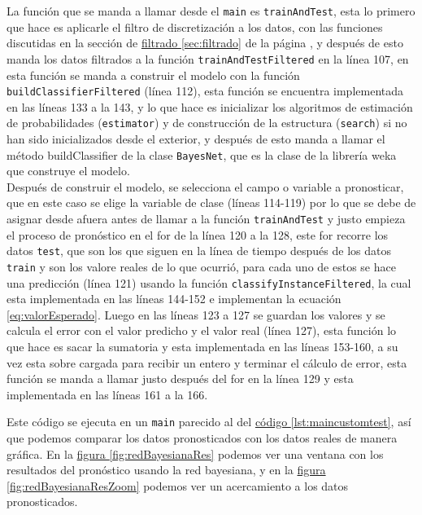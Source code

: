 La función que se manda a llamar desde el \texttt{main} es \texttt{trainAndTest}, esta lo primero que hace es aplicarle el filtro de discretización a los datos, con las funciones discutidas en la sección de \hyperref[sec:filtrado]{ filtrado \ref{sec:filtrado}} de la página \pageref{sec:filtrado}, y después de esto manda los datos filtrados a la función \texttt{trainAndTestFiltered} en la línea 107, en esta función se manda a construir el modelo con la función \texttt{buildClassifierFiltered} (línea 112), esta función se encuentra implementada en las líneas 133 a la 143, y lo que hace es inicializar los algoritmos de estimación de probabilidades (\texttt{estimator}) y de construcción de la estructura (\texttt{search}) si no han sido inicializados desde el exterior, y después de esto manda a llamar el método buildClassifier de la clase \texttt{BayesNet}, que es la clase de la librería weka que construye el modelo.\\
Después de construir el modelo, se selecciona el campo o variable a pronosticar, que en este caso se elige la variable de clase (líneas 114-119) por lo que se debe de asignar desde afuera antes de llamar a la función \texttt{trainAndTest} y justo empieza el proceso de pronóstico en el for de la línea 120 a la 128, este for recorre los datos \texttt{test}, que son los que siguen en la línea de tiempo después de los datos \texttt{train} y son los valore reales de lo que ocurrió, para cada uno de estos se hace una predicción (línea 121) usando la función \texttt{classifyInstanceFiltered}, la cual esta implementada en las líneas 144-152 e implementan la ecuación \ref{eq:valorEsperado}. Luego en las líneas 123 a 127 se guardan los valores y se calcula el error con el valor predicho y el valor real (línea 127), esta función lo que hace es sacar la sumatoria y esta implementada en las líneas 153-160, a su vez esta sobre cargada para recibir un entero y terminar el cálculo de error, esta función se manda a llamar justo después del for en la línea 129 y esta implementada en las líneas 161 a la 166.

Este código se ejecuta en un \texttt{main} parecido al del \hyperref[lst:maincustomtest]{ código \ref{lst:maincustomtest}}, así que podemos comparar los datos pronosticados con los datos reales de manera gráfica. En la  \hyperref[fig:redBayesianaRes]{ figura \ref{fig:redBayesianaRes}} podemos ver una ventana con los resultados del pronóstico usando la red bayesiana, y en la \hyperref[fig:redBayesianaResZoom]{ figura \ref{fig:redBayesianaResZoom}} podemos ver un acercamiento a los datos pronosticados.

